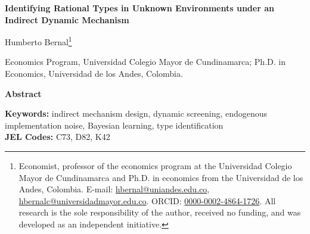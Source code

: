 \documentclass[12pt]{article}
\begin{document}
\begin{center}
    \singlespacing
    {\Large\bf Identifying Rational Types in Unknown Environments under an Indirect Dynamic Mechanism}
    
    \vspace{1.5cm}
    
    {\large Humberto Bernal\footnote{Economist, professor of the economics program at the Universidad Colegio Mayor de Cundinamarca and Ph.D. in economics from the Universidad de los Andes, Colombia. E-mail: \href{mailto:hbernal@uniandes.edu.co}{hbernal@uniandes.edu.co}, \href{mailto:hbernalc@universidadmayor.edu.co}{hbernalc@universidadmayor.edu.co}. ORCID: \href{https://orcid.org/0000-0002-4864-1726}{0000-0002-4864-1726}. All research is the sole responsibility of the author, received no funding, and was developed as an independent initiative.}}
    
    \vspace{0.5cm}
    
    {\small Economics Program, Universidad Colegio Mayor de Cundinamarca; Ph.D. in Economics, Universidad de los Andes, Colombia.}
    
    \vspace{1.5cm}
    
    \textbf{Abstract}
\end{center}

\begin{abstract}
This paper develops a dynamic indirect mechanism to identify rational types in unknown environments characterized by observational pooling. The central theoretical contribution introduces the Mano de Dios--Guadalupe (MDG) process, an endogenous implementation noise kernel that maps latent intentions into executed actions with full support in the Bayesian game. Integrating the MDG process with a competing risks framework, the Rational Type Identification Theorem is established, whereby posterior Bayesian beliefs converge almost surely to the true type. Furthermore, the Implementability Theorem is presented, which guarantees that the mechanism is executable in a perfect Bayesian equilibrium. The empirical application to kidnapping for ransom in Colombia validates the theoretical framework through a microeconometric calibration and structural simulations that demonstrate the robustness of both Bayesian learning and incentive compatibility constraint compliance.
\end{abstract}

\vspace{1cm}

\noindent \textbf{Keywords:} indirect mechanism design, dynamic screening, endogenous implementation noise, Bayesian learning, type identification \\
\noindent \textbf{JEL Codes:} C73, D82, K42
\end{document}
